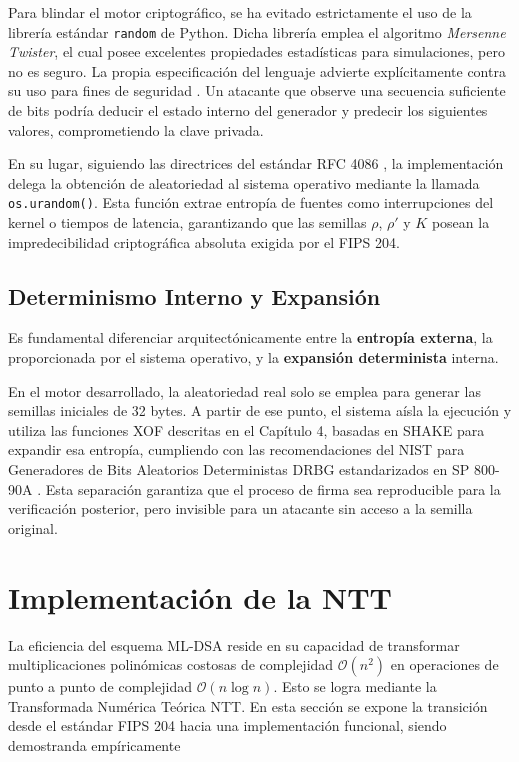 \documentclass[11pt, a4paper]{report}
\theoremstyle{definition}
\begin{document}
Para blindar el motor criptográfico, se ha evitado estrictamente el uso de la librería estándar \texttt{random} de Python. Dicha librería emplea el algoritmo \textit{Mersenne Twister}, el cual posee excelentes propiedades estadísticas para simulaciones, pero no es seguro. La propia especificación del lenguaje advierte explícitamente contra su uso para fines de seguridad \cite{python_docs_random}. Un atacante que observe una secuencia suficiente de bits podría deducir el estado interno del generador y predecir los siguientes valores, comprometiendo la clave privada.

En su lugar, siguiendo las directrices del estándar RFC 4086 \cite{rfc4086}, la implementación delega la obtención de aleatoriedad al sistema operativo mediante la llamada \texttt{os.urandom()}. Esta función extrae entropía de fuentes como interrupciones del kernel o tiempos de latencia, garantizando que las semillas $\rho$, $\rho'$ y $K$ posean la impredecibilidad criptográfica absoluta exigida por el FIPS 204.

\subsection{Determinismo Interno y Expansión}

Es fundamental diferenciar arquitectónicamente entre la \textbf{entropía externa}, la proporcionada por el sistema operativo, y la \textbf{expansión determinista} interna. 

En el motor desarrollado, la aleatoriedad real solo se emplea para generar las semillas iniciales de 32 bytes. A partir de ese punto, el sistema aísla la ejecución y utiliza las funciones XOF descritas en el Capítulo 4, basadas en SHAKE para expandir esa entropía, cumpliendo con las recomendaciones del NIST para Generadores de Bits Aleatorios Deterministas DRBG estandarizados en SP 800-90A \cite{nist_sp800_90a}. Esta separación garantiza que el proceso de firma sea reproducible para la verificación posterior, pero invisible para un atacante sin acceso a la semilla original.


\section{Implementación de la NTT}
\label{sec:implementacion_ntt}

La eficiencia del esquema ML-DSA reside en su capacidad de transformar multiplicaciones polinómicas costosas de complejidad $\mathcal{O}(n^2)$ en operaciones de punto a punto de complejidad $\mathcal{O}(n \log n)$. Esto se logra mediante la Transformada Numérica Teórica NTT. En esta sección se expone la transición desde el estándar FIPS 204 hacia una implementación funcional, siendo demostranda empíricamente
\end{document}
